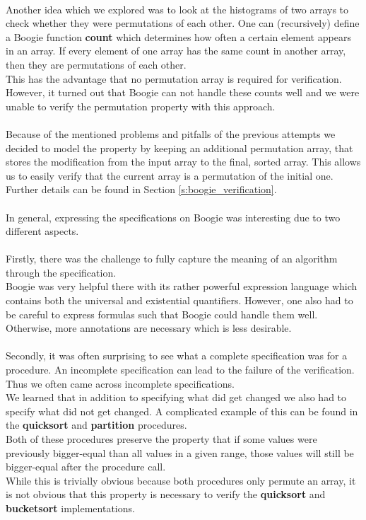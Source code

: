 \documentclass{report}
\begin{document}
\\
Another idea which we explored was to look at the histograms of two arrays to
check whether they were permutations of each other. One can (recursively) define a
Boogie function \textbf{count} which determines how often a certain element appears in an 
array. If every element of one array has the same count in another array, then they
are permutations of each other.\\
This has the advantage that no permutation array is required for verification.\\
However, it turned out that Boogie can not handle these counts well and we were
unable to verify the permutation property with this approach.
\\
\\
Because of the mentioned problems and pitfalls of the previous attempts we decided to model the property by keeping an additional permutation array, that stores the modification from the input array to the final, sorted array. This allows us to easily verify that the current array is a permutation of the initial one. Further details can be found in Section \ref{s:boogie_verification}.
\\\\
In general, expressing the specifications on Boogie was interesting due to two different aspects.
\\
\\
Firstly, there was the challenge to fully capture the meaning of an algorithm
through the specification.\\
Boogie was very helpful there with its rather powerful expression language which
contains both the universal and existential quantifiers.
However, one also had to be careful to express formulas such that Boogie could
handle them well. Otherwise, more annotations are necessary which is less desirable.
\\
\\
Secondly, it was often surprising to see what a complete specification was for a procedure.
An incomplete specification can lead to the failure of the verification.
Thus we often came across incomplete specifications.\\
We learned that in addition to specifying what did get changed we also had to
specify what did not get changed. A complicated example of this can be found in
the \textbf{quicksort} and \textbf{partition} procedures.\\
Both of these procedures preserve the property that if some values were previously
bigger-equal than all values in a given range, those values will still be bigger-equal
after the procedure call.\\
While this is trivially obvious because both procedures only permute an array,
it is not obvious that this property is necessary to verify the
\textbf{quicksort} and \textbf{bucketsort} implementations.
\end{document}
